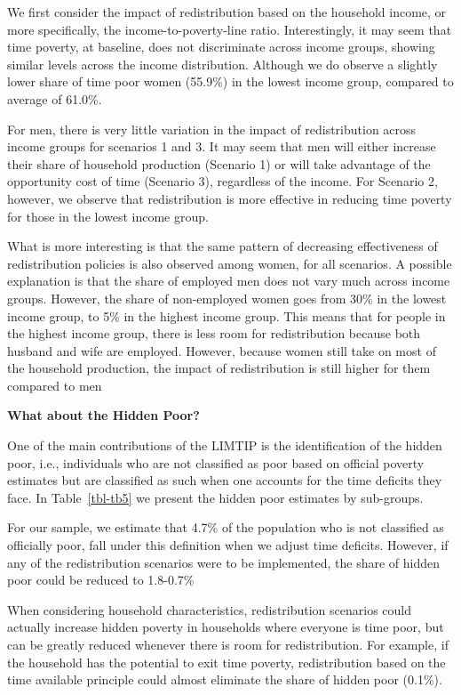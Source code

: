 \documentclass[
  11pt,
]{article}
\begin{document}
We first consider the impact of redistribution based on the household
income, or more specifically, the income-to-poverty-line ratio.
Interestingly, it may seem that time poverty, at baseline, does not
discriminate across income groups, showing similar levels across the
income distribution. Although we do observe a slightly lower share of
time poor women (55.9\%) in the lowest income group, compared to average
of 61.0\%.

For men, there is very little variation in the impact of redistribution
across income groups for scenarios 1 and 3. It may seem that men will
either increase their share of household production (Scenario 1) or will
take advantage of the opportunity cost of time (Scenario 3), regardless
of the income. For Scenario 2, however, we observe that redistribution
is more effective in reducing time poverty for those in the lowest
income group.

What is more interesting is that the same pattern of decreasing
effectiveness of redistribution policies is also observed among women,
for all scenarios. A possible explanation is that the share of employed
men does not vary much across income groups. However, the share of
non-employed women goes from 30\% in the lowest income group, to 5\% in
the highest income group. This means that for people in the highest
income group, there is less room for redistribution because both husband
and wife are employed. However, because women still take on most of the
household production, the impact of redistribution is still higher for
them compared to men

\textbf{What about the Hidden Poor?}

One of the main contributions of the LIMTIP is the identification of the
hidden poor, i.e., individuals who are not classified as poor based on
official poverty estimates but are classified as such when one accounts
for the time deficits they face. In Table~\ref{tbl-tb5} we present the
hidden poor estimates by sub-groups.

For our sample, we estimate that 4.7\% of the population who is not
classified as officially poor, fall under this definition when we adjust
time deficits. However, if any of the redistribution scenarios were to
be implemented, the share of hidden poor could be reduced to 1.8-0.7\%

When considering household characteristics, redistribution scenarios
could actually increase hidden poverty in households where everyone is
time poor, but can be greatly reduced whenever there is room for
redistribution. For example, if the household has the potential to exit
time poverty, redistribution based on the time available principle could
almost eliminate the share of hidden poor (0.1\%).
\end{document}
